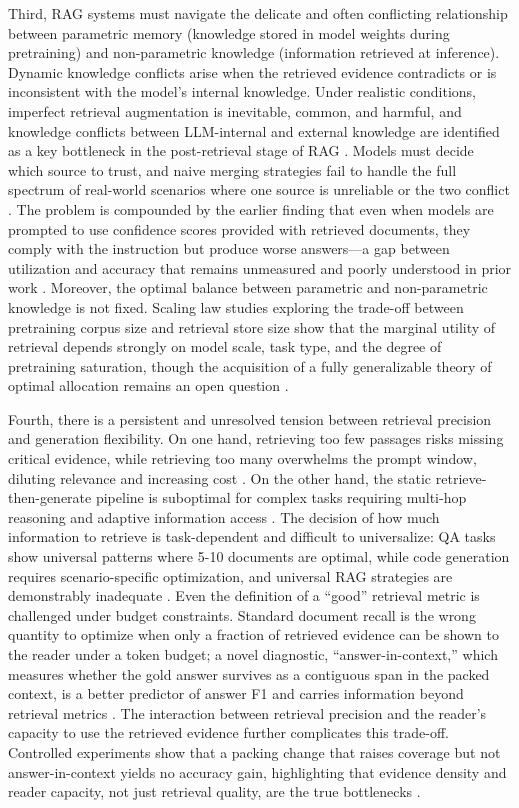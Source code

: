 \documentclass[11pt]{article}
\begin{document}
Third, RAG systems must navigate the delicate and often conflicting relationship between parametric memory (knowledge stored in model weights during pretraining) and non-parametric knowledge (information retrieved at inference). Dynamic knowledge conflicts arise when the retrieved evidence contradicts or is inconsistent with the model's internal knowledge. Under realistic conditions, imperfect retrieval augmentation is inevitable, common, and harmful, and knowledge conflicts between LLM-internal and external knowledge are identified as a key bottleneck in the post-retrieval stage of RAG \cite{ref215}. Models must decide which source to trust, and naive merging strategies fail to handle the full spectrum of real-world scenarios where one source is unreliable or the two conflict \cite{ref600}. The problem is compounded by the earlier finding that even when models are prompted to use confidence scores provided with retrieved documents, they comply with the instruction but produce worse answers---a gap between utilization and accuracy that remains unmeasured and poorly understood in prior work \cite{ref601}. Moreover, the optimal balance between parametric and non-parametric knowledge is not fixed. Scaling law studies exploring the trade-off between pretraining corpus size and retrieval store size show that the marginal utility of retrieval depends strongly on model scale, task type, and the degree of pretraining saturation, though the acquisition of a fully generalizable theory of optimal allocation remains an open question \cite{ref225}.

Fourth, there is a persistent and unresolved tension between retrieval precision and generation flexibility. On one hand, retrieving too few passages risks missing critical evidence, while retrieving too many overwhelms the prompt window, diluting relevance and increasing cost \cite{ref602}. On the other hand, the static retrieve-then-generate pipeline is suboptimal for complex tasks requiring multi-hop reasoning and adaptive information access \cite{ref19}. The decision of how much information to retrieve is task-dependent and difficult to universalize: QA tasks show universal patterns where 5-10 documents are optimal, while code generation requires scenario-specific optimization, and universal RAG strategies are demonstrably inadequate \cite{ref62}. Even the definition of a ``good'' retrieval metric is challenged under budget constraints. Standard document recall is the wrong quantity to optimize when only a fraction of retrieved evidence can be shown to the reader under a token budget; a novel diagnostic, ``answer-in-context,'' which measures whether the gold answer survives as a contiguous span in the packed context, is a better predictor of answer F1 and carries information beyond retrieval metrics \cite{ref603}. The interaction between retrieval precision and the reader's capacity to use the retrieved evidence further complicates this trade-off. Controlled experiments show that a packing change that raises coverage but not answer-in-context yields no accuracy gain, highlighting that evidence density and reader capacity, not just retrieval quality, are the true bottlenecks \cite{ref603}.
\end{document}
